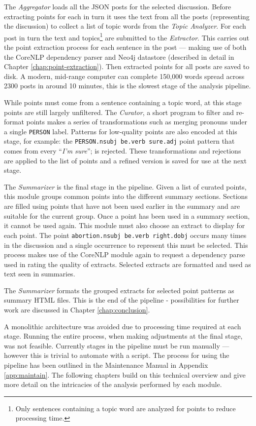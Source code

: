   The \textit{Aggregator} loads all the JSON posts for the selected discussion. Before extracting points for each in turn it uses the text from all the posts (representing the discussion) to collect a list of topic words from the \textit{Topic Analyzer}. For each post in turn the text and topics\footnote{Only sentences containing a topic word are analyzed for points to reduce processing time.} are submitted to the \textit{Extractor}. This carries out the point extraction process for each sentence in the post --- making use of both the CoreNLP dependency parser and Neo4j datastore (described in detail in Chapter \ref{chap:point-extraction}). Then extracted points for all posts are saved to disk. A modern, mid-range computer can complete 150,000 words spread across 2300 posts in around 10 minutes, this is the slowest stage of the analysis pipeline.

  While points must come from a sentence containing a topic word, at this stage points are still largely unfiltered. The \textit{Curator}, a short program to filter and re-format points makes a series of transformations such as merging pronouns under a single \texttt{PERSON} label. Patterns for low-quality points are also encoded at this stage, for example: the \texttt{PERSON.nsubj be.verb sure.adj} point pattern that comes from every ``\textit{I'm sure}''; is rejected. These transformations and rejections are applied to the list of points and a refined version is saved for use at the next stage.

  The \textit{Summarizer} is the final stage in the pipeline. Given a list of curated points, this module groups common points into the different summary sections. Sections are filled using points that have not been used earlier in the summary and are suitable for the current group. Once a point has been used in a summary section, it cannot be used again. This module must also choose an extract to display for each point. The point \texttt{abortion.nsubj be.verb right.dobj} occurs many times in the discussion and a single occurrence to represent this must be selected. This process makes use of the CoreNLP module again to request a dependency parse used in rating the quality of extracts. Selected extracts are formatted and used as text seen in summaries.

  The \textit{Summarizer} formats the grouped extracts for selected point patterns as summary HTML files. This is the end of the pipeline - possibilities for further work are discussed in Chapter \ref{chap:conclusion}.

  A monolithic architecture was avoided due to processing time required at each stage. Running the entire process, when making adjustments at the final stage, was not feasible. Currently stages in the pipeline must be run manually --- however this is trivial to automate with a script. The process for using the pipeline has been outlined in the Maintenance Manual in Appendix \ref{app:maintain}. The following chapters build on this technical overview and give more detail on the intricacies of the analysis performed by each module.
